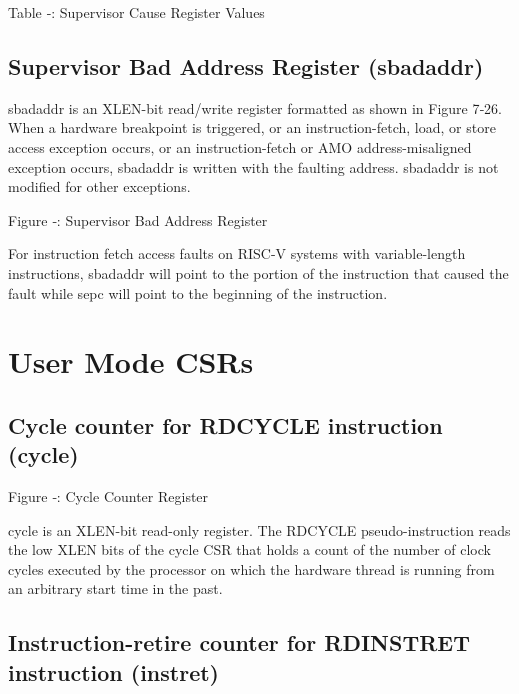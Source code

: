 \protect\hypertarget{_Ref326948300}{}{}Table ‑: Supervisor Cause
Register Values

\subsection{Supervisor Bad Address Register
(sbadaddr)}\label{supervisor-bad-address-register-sbadaddr}

sbadaddr is an XLEN-bit read/write register formatted as shown in Figure
7‑26. When a hardware breakpoint is triggered, or an instruction-fetch,
load, or store access exception occurs, or an instruction-fetch or AMO
address-misaligned exception occurs, sbadaddr is written with the
faulting address. sbadaddr is not modified for other exceptions.

\missingfigure{}

\protect\hypertarget{_Ref367099017}{}{}Figure ‑: Supervisor Bad Address
Register

For instruction fetch access faults on RISC-V systems with
variable-length instructions, sbadaddr will point to the portion of the
instruction that caused the fault while sepc will point to the beginning
of the instruction.

\protect\hypertarget{_Toc327108372}{}{}

\section{User Mode CSRs}\label{user-mode-csrs}

\subsection{Cycle counter for RDCYCLE instruction
(cycle)}\label{cycle-counter-for-rdcycle-instruction-cycle}

\missingfigure{}

Figure ‑: Cycle Counter Register

cycle is an XLEN-bit read-only register. The RDCYCLE pseudo-instruction
reads the low XLEN bits of the cycle CSR that holds a count of the
number of clock cycles executed by the processor on which the hardware
thread is running from an arbitrary start time in the past.

\subsection{Instruction-retire counter for RDINSTRET instruction
(instret)}\label{instruction-retire-counter-for-rdinstret-instruction-instret}

